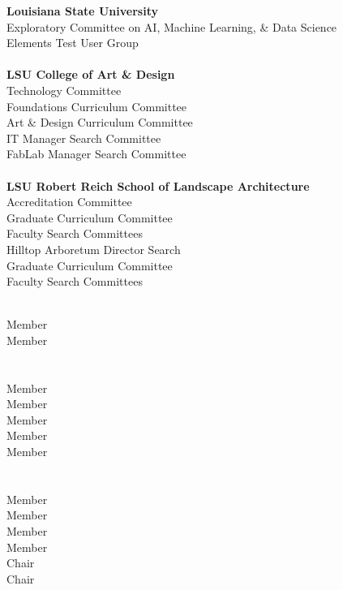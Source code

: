 \documentclass[10pt]{designcv}
\begin{document}
\begin{minipage}[t]{0.7\textwidth}
\raggedright
\textbf{Louisiana State University}\\
Exploratory Committee on AI, Machine Learning, \& Data Science\\
Elements Test User Group\\
\ \\
\textbf{LSU College of Art \& Design}\\
Technology Committee\\
Foundations Curriculum Committee\\
Art \& Design Curriculum Committee\\
IT Manager Search Committee\\
FabLab Manager Search Committee\\
\ \\
\textbf{LSU Robert Reich School of Landscape Architecture}\\ 
Accreditation Committee\\
Graduate Curriculum Committee\\
Faculty Search Committees\\
Hilltop Arboretum Director Search\\
Graduate Curriculum Committee\\
Faculty Search Committees\\
\end{minipage}
\hfill
\begin{minipage}[t]{0.125\textwidth} 
\ \\
Member\\
Member\\
\ \\
\ \\
Member\\
Member\\
Member\\
Member\\
Member\\
\ \\
\ \\
Member\\
Member\\
Member\\
Member\\
Chair\\
Chair\\
\end{minipage}
\hfill
\end{document}
